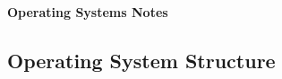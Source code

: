 \documentclass{article}
\begin{document}
\textbf{\Huge Operating Systems Notes}

\subsection{Operating System Structure}
\end{document}
